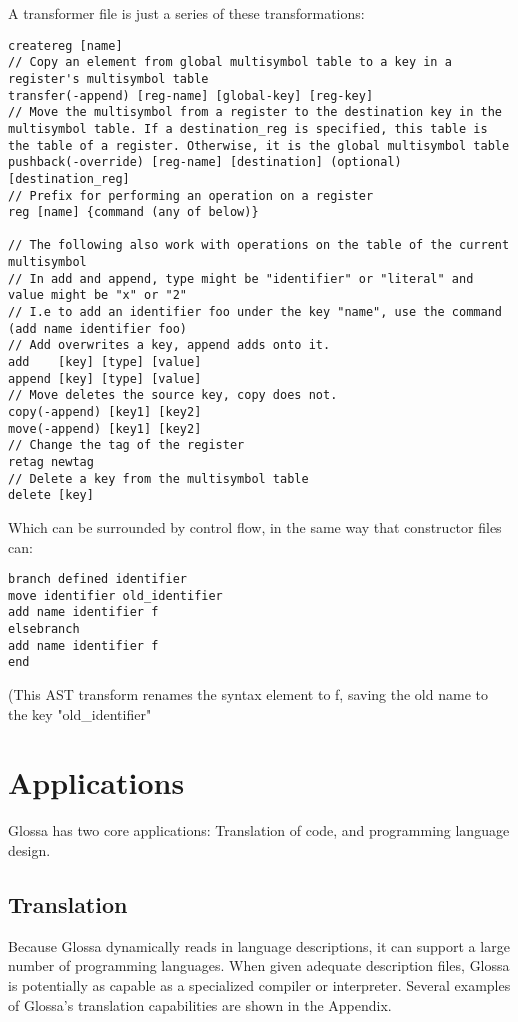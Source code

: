 \documentclass{article}
\begin{document}
A transformer file is just a series of these transformations:
\begin{verbatim}
createreg [name]
// Copy an element from global multisymbol table to a key in a register's multisymbol table
transfer(-append) [reg-name] [global-key] [reg-key] 
// Move the multisymbol from a register to the destination key in the multisymbol table. If a destination_reg is specified, this table is the table of a register. Otherwise, it is the global multisymbol table
pushback(-override) [reg-name] [destination] (optional)[destination_reg]
// Prefix for performing an operation on a register
reg [name] {command (any of below)} 

// The following also work with operations on the table of the current multisymbol
// In add and append, type might be "identifier" or "literal" and value might be "x" or "2"
// I.e to add an identifier foo under the key "name", use the command (add name identifier foo)
// Add overwrites a key, append adds onto it.
add    [key] [type] [value]
append [key] [type] [value]
// Move deletes the source key, copy does not.
copy(-append) [key1] [key2]
move(-append) [key1] [key2]
// Change the tag of the register
retag newtag
// Delete a key from the multisymbol table
delete [key]
\end{verbatim}
Which can be surrounded by control flow, in the same way that constructor files can:
\begin{verbatim}
branch defined identifier 
move identifier old_identifier
add name identifier f
elsebranch
add name identifier f
end
\end{verbatim}
(This AST transform renames the syntax element to f, saving the old name to the key "old\_identifier"

\section{Applications}

Glossa has two core applications: Translation of code, and programming language design.

\subsection{Translation}

Because Glossa dynamically reads in language descriptions, it can support a large number of programming languages.
When given adequate description files, Glossa is potentially as capable as a specialized compiler or interpreter.
Several examples of Glossa's translation capabilities are shown in the Appendix.
\end{document}
